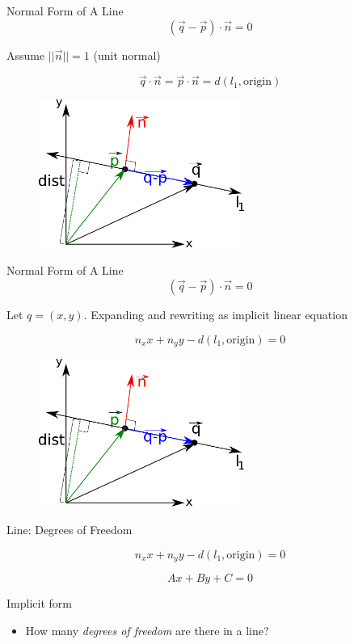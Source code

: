 \documentclass{beamer}
\begin{document}
\begin{frame}{Normal Form of A Line}
\[ (\vec{q} - \vec{p}) \cdot \vec{n} = 0 \]

Assume $||\vec{n}|| = 1$ (unit normal)

\[ \vec{q} \cdot \vec{n} = \vec{p} \cdot \vec{n} = d(l_1, \text{origin}) \]



\begin{figure}[t]
	\centering
	\includegraphics[width=0.6\textwidth]{LineNormalFormDist.pdf}
\end{figure}

\end{frame}


\begin{frame}{Normal Form of A Line}
\[ (\vec{q} - \vec{p}) \cdot \vec{n} = 0 \]

Let $q = (x, y)$.  Expanding and rewriting as implicit linear equation

\[ n_x x + n_y y - d(l_1, \text{origin}) = 0 \]



\begin{figure}[t]
	\centering
	\includegraphics[width=0.6\textwidth]{LineNormalFormDist.pdf}
\end{figure}

\end{frame}

\begin{frame}{Line: Degrees of Freedom}

\[ n_x x + n_y y - d(l_1, \text{origin}) = 0 \]

\[ Ax + By + C = 0 \]

Implicit form

\begin{itemize}[label=$\vartriangleright$]

\item How many {\em degrees of freedom} are there in a line?

\end{itemize}

\end{frame}
\end{document}
